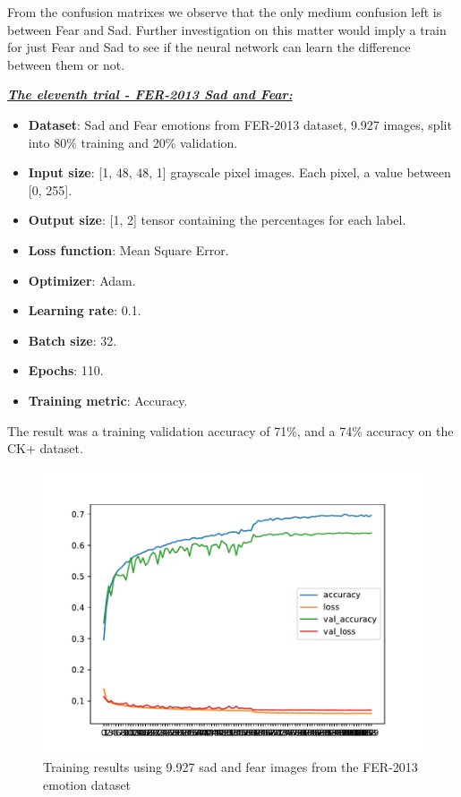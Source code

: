 \documentclass[runningheads,a4paper,11pt]{report}
\begin{document}
From the confusion matrixes we observe that the only medium confusion left is between Fear and Sad. Further investigation on this matter would imply a train for just Fear and Sad to see if the neural network can learn the difference between them or not.

\clearpage
\underline{\textbf{\emph{The eleventh trial - FER-2013 Sad and Fear:}}}
\begin{itemize}
	\item \textbf{Dataset}: Sad and Fear emotions from FER-2013 dataset, 9.927 images, split into 80\% training and 20\% validation.
	\item \textbf{Input size}: [1, 48, 48, 1] grayscale pixel images. Each pixel, a value between [0, 255].
	\item \textbf{Output size}: [1, 2] tensor containing the percentages for each label.
	\item \textbf{Loss function}: Mean Square Error.
	\item \textbf{Optimizer}: Adam.
	\item \textbf{Learning rate}: 0.1.
	\item \textbf{Batch size}: 32.
	\item \textbf{Epochs}: 110.
	\item \textbf{Training metric}: Accuracy.
\end{itemize}
The result was a training validation accuracy of 71\%, and a 74\% accuracy on the CK+ dataset.
\begin{figure}[htbp]
\begin{center}
	\includegraphics[scale=0.8]{Fig/sad_and_fear_fer_2013_01_mean_square.pdf}
	\caption{Training results using 9.927 sad and fear images from the FER-2013 emotion dataset}
	\label{sad_and_fear_fer_2013_01_mean_square}
\end{center}
\end{figure}
\end{document}
